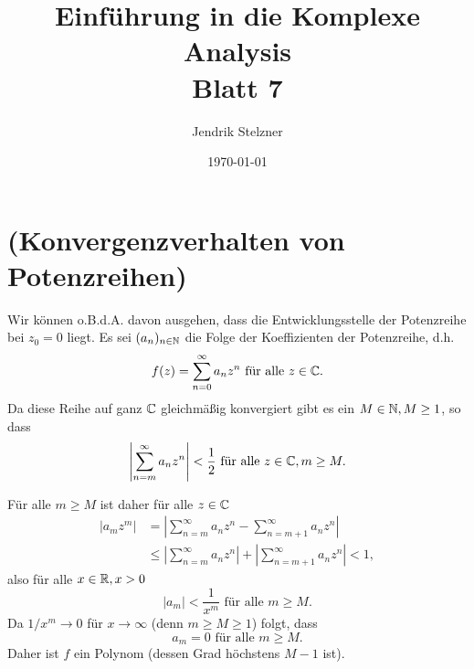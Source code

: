 \documentclass[a4paper,10pt]{article}
\title{Einführung in die Komplexe Analysis \\ \Large Blatt 7}
\author{Jendrik Stelzner}
\date{\today}
\begin{document}
\maketitle





\section{(Konvergenzverhalten von Potenzreihen)}
Wir können o.B.d.A. davon ausgehen, dass die Entwicklungsstelle der Potenzreihe bei $z_0 = 0$ liegt. Es sei $(a_n)_{n \in \mathbb{N}}$ die Folge der Koeffizienten der Potenzreihe, d.h.
\[
 f(z) = \sum_{n=0}^\infty a_n z^n \text{ für alle } z \in \mathbb{C}.
\]
Da diese Reihe auf ganz $\mathbb{C}$ gleichmäßig konvergiert gibt es ein $M \in \mathbb{N}, M \geq 1$, so dass
\[
 \left| \sum_{n=m}^\infty a_n z^n \right| < \frac{1}{2} \text{ für alle } z \in \mathbb{C}, m \geq M.
\]

Für alle $m \geq M$ ist daher für alle $z \in \mathbb{C}$
\begin{align*}
 \left| a_m z^m \right|
 &= \left| \sum_{n=m}^\infty a_n z^n - \sum_{n=m+1}^\infty a_n z^n \right| \\
 &\leq \left| \sum_{n=m}^\infty a_n z^n \right| + \left| \sum_{n=m+1}^\infty a_n z^n \right|
 < 1,
\end{align*}
also für alle $x \in \mathbb{R}, x > 0$
\[
 |a_m| < \frac{1}{x^m} \text{ für alle } m \geq M.
\]
Da $1/x^m \to 0$ für $x \to \infty$ (denn $m \geq M \geq 1$) folgt, dass
\[
 a_m = 0 \text{ für alle } m \geq M.
\]
Daher ist $f$ ein Polynom (dessen Grad höchstens $M-1$ ist).
\end{document}
